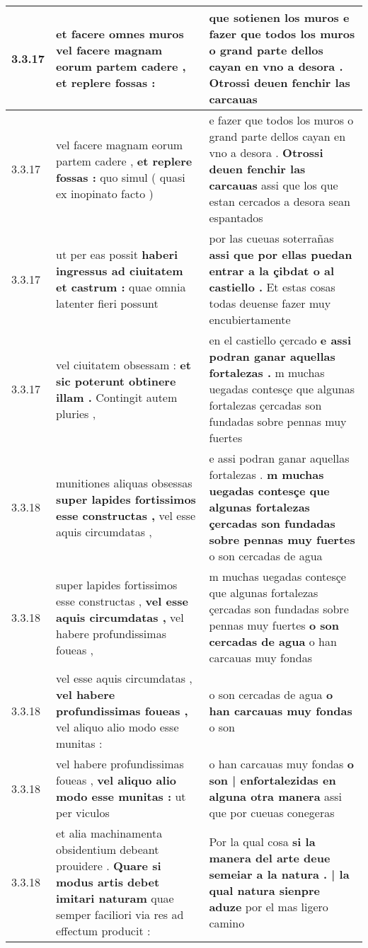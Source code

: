\begin{tabular}{|p{1cm}|p{6.5cm}|p{6.5cm}|}
3.3.17 & et facere omnes muros \textbf{ vel facere magnam eorum partem cadere , } et replere fossas : & que sotienen los muros \textbf{ e fazer que todos los muros o grand parte dellos cayan en vno a desora . } Otrossi deuen fenchir las carcauas \\\hline
3.3.17 & vel facere magnam eorum partem cadere , \textbf{ et replere fossas : } quo simul ( quasi ex inopinato facto ) & e fazer que todos los muros o grand parte dellos cayan en vno a desora . \textbf{ Otrossi deuen fenchir las carcauas } assi que los que estan cercados a desora sean espantados \\\hline
3.3.17 & ut per eas possit \textbf{ haberi ingressus ad ciuitatem et castrum : } quae omnia latenter fieri possunt & por las cueuas soterrañas \textbf{ assi que por ellas puedan entrar a la çibdat o al castiello . } Et estas cosas todas deuense fazer muy encubiertamente \\\hline
3.3.17 & vel ciuitatem obsessam : \textbf{ et sic poterunt obtinere illam . } Contingit autem pluries , & en el castiello çercado \textbf{ e assi podran ganar aquellas fortalezas . } m muchas uegadas contesçe que algunas fortalezas çercadas son fundadas sobre pennas muy fuertes \\\hline
3.3.18 & munitiones aliquas obsessas \textbf{ super lapides fortissimos esse constructas , } vel esse aquis circumdatas , & e assi podran ganar aquellas fortalezas . \textbf{ m muchas uegadas contesçe que algunas fortalezas çercadas son fundadas sobre pennas muy fuertes } o son cercadas de agua \\\hline
3.3.18 & super lapides fortissimos esse constructas , \textbf{ vel esse aquis circumdatas , } vel habere profundissimas foueas , & m muchas uegadas contesçe que algunas fortalezas çercadas son fundadas sobre pennas muy fuertes \textbf{ o son cercadas de agua } o han carcauas muy fondas \\\hline
3.3.18 & vel esse aquis circumdatas , \textbf{ vel habere profundissimas foueas , } vel aliquo alio modo esse munitas : & o son cercadas de agua \textbf{ o han carcauas muy fondas } o son \\\hline
3.3.18 & vel habere profundissimas foueas , \textbf{ vel aliquo alio modo esse munitas : } ut per viculos & o han carcauas muy fondas \textbf{ o son | enfortalezidas en alguna otra manera } assi que por cueuas conegeras \\\hline
3.3.18 & et alia machinamenta obsidentium debeant prouidere . \textbf{ Quare si modus artis debet imitari naturam } quae semper faciliori via res ad effectum producit : & Por la qual cosa \textbf{ si la manera del arte deue semeiar a la natura . | la qual natura sienpre aduze } por el mas ligero camino \\\hline

\end{tabular}
